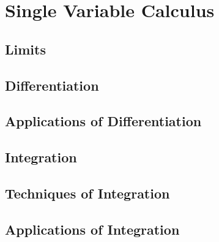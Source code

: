 \section{Single Variable Calculus}

\subsection{Limits}
\subsection{Differentiation}
\subsection{Applications of Differentiation}
\subsection{Integration}
\subsection{Techniques of Integration}
\subsection{Applications of Integration}